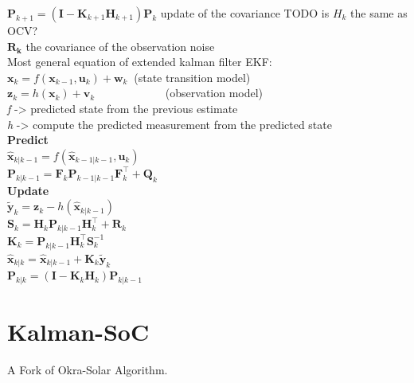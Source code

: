 $ \mathbf {P} _{k+1}=\left(\mathbf {I} -\mathbf {K} _{k+1}\mathbf {H} _{k+1}\right)\mathbf {P} _{k} $ update of the covariance TODO is $H_{k}$ the same as OCV? \\

$\mathbf{R_k}$ the covariance of the observation noise  \\

Most general equation of extended kalman filter EKF: \\

$ \mathbf {x}_{k}=f(\mathbf {x} _{k-1},\mathbf {u}_{k})+\mathbf {w}_{k}\ $ (state transition model) \\
$\mathbf {z}_{k}=h(\mathbf {x} _{k})+\mathbf {v}_{k}$ \ \ \ \ \ \ \ \ \ \ \  \ (observation model)  \\
\emph{f} ->  predicted state from the previous estimate  \\
\emph{h} ->  compute the predicted measurement from the predicted state \\


\textbf{Predict} \\
${\displaystyle {\hat {\boldsymbol {x}}}_{k|k-1}=f({\hat {\boldsymbol {x}}}_{k-1|k-1},{\boldsymbol {u}}_{k})} $ \\
${\displaystyle {\boldsymbol {P}}_{k|k-1}={{\boldsymbol {F}}_{k}}{\boldsymbol {P}}_{k-1|k-1}{{\boldsymbol {F}}_{k}^{\top }}+{\boldsymbol {Q}}_{k}}$ \\

\textbf{Update} \\
${\tilde  {{\boldsymbol  {y}}}}_{{k}}={\boldsymbol  {z}}_{{k}}-h({\hat  {{\boldsymbol  {x}}}}_{{k|k-1}})$ \\
${\boldsymbol  {S}}_{{k}}={{{\boldsymbol  {H}}_{{k}}}}{\boldsymbol  {P}}_{{k|k-1}}{{{\boldsymbol  {H}}_{{k}}^{\top }}}+{\boldsymbol  {R}}_{{k}}$ \\
${\boldsymbol  {K}}_{{k}}={\boldsymbol  {P}}_{{k|k-1}}{{{\boldsymbol  {H}}_{{k}}^{\top }}}{\boldsymbol  {S}}_{{k}}^{{-1}}$ \\
${\hat  {{\boldsymbol  {x}}}}_{{k|k}}={\hat  {{\boldsymbol  {x}}}}_{{k|k-1}}+{\boldsymbol  {K}}_{{k}}{\tilde  {{\boldsymbol  {y}}}}_{{k}}$ \\
${\boldsymbol  {P}}_{{k|k}}=({\boldsymbol  {I}}-{\boldsymbol  {K}}_{{k}}{{{\boldsymbol  {H}}_{{k}}}}){\boldsymbol  {P}}_{{k|k-1}}$ \\




\section{Kalman-SoC}
A Fork of Okra-Solar Algorithm. \

